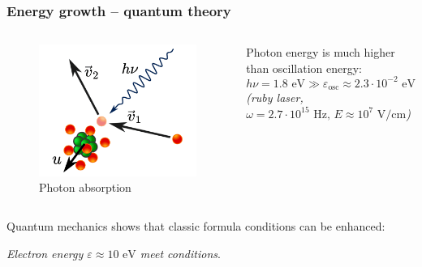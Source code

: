 \documentclass{beamer}
\begin{document}
	\begin{frame}
		\frametitle{Energy growth -- quantum theory}
		
		\begin{columns}
			\begin{figure}
				\centering
				\includegraphics[width=0.8\linewidth]{res/collision_with_recoil.png}
				\caption*{Photon absorption}
			\end{figure}
			
			Photon energy is much higher than oscillation energy:
			$$  h\nu = 1.8 \text{ eV} \gg\varepsilon_{\text{osc}} \approx 2.3\cdot 10^{-2} \text{ eV} $$
			\footnotesize
			\emph{(ruby laser, $\omega = 2.7 \cdot 10^{15} \text{ Hz, } E \approx 10^7 \text{ V/cm}$)}
		\end{columns}
		
		Quantum mechanics shows that classic formula conditions can be enhanced:
		\begin{center}
		\end{center}
		
		\footnotesize
		\emph{Electron energy $\varepsilon \approx 10 \text{ eV}$ meet conditions}.
		
		
		
	\end{frame}
	
\end{document}
